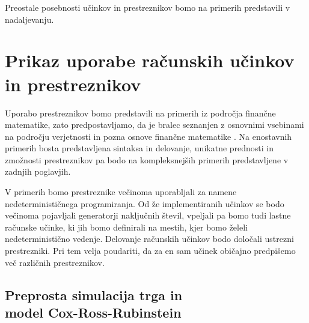\documentclass[a4paper,12pt]{article}
\theoremstyle{definition} %
\begin{document}
Preostale posebnosti učinkov in prestreznikov bomo na primerih predstavili v nadaljevanju.

\section{Prikaz uporabe računskih učinkov in prestreznikov}

Uporabo prestreznikov bomo predstavili na primerih iz področja finančne matematike, zato predpostavljamo, da je bralec seznanjen z osnovnimi vsebinami na področju verjetnosti in pozna osnove finančne matematike \cite{finMath}. Na enostavnih primerih bosta predstavljena sintaksa in delovanje, unikatne prednosti in zmožnosti prestreznikov pa bodo na kompleksnejših primerih predstavljene v zadnjih poglavjih. 

V primerih bomo prestreznike večinoma uporabljali za namene nedeterminističnega programiranja. Od že implementiranih učinkov se bodo večinoma pojavljali generatorji naključnih števil, vpeljali pa bomo tudi lastne računske učinke, ki jih bomo definirali na mestih, kjer bomo želeli nedeterministično vedenje. Delovanje računskih učinkov bodo določali ustrezni prestrezniki. Pri tem velja poudariti, da za en sam učinek običajno predpišemo več različnih prestreznikov.

\subsection{Preprosta simulacija trga in \\ model Cox-Ross-Rubinstein}
\end{document}
